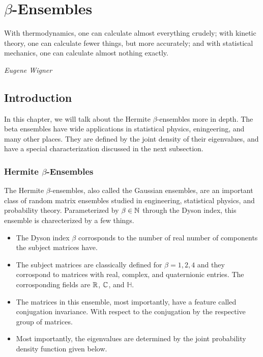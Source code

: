 
\chapter{$\beta$-Ensembles}

\epigraph{With thermodynamics, one can calculate almost everything crudely; with kinetic theory, one can calculate fewer things, but more accurately;
and with statistical mechanics, one can calculate almost nothing exactly.}{\textit{Eugene Wigner}}

\section{Introduction}

In this chapter, we will talk about the Hermite $\beta$-ensembles more in depth.
The beta ensembles have wide applications in statistical physics, eningeering, and many other places.
They are defined by the joint density of their eigenvalues, and have a special characterization discussed in the next subsection.


\subsection{Hermite $\beta$-Ensembles}

The Hermite $\beta$-ensembles, also called the Gaussian ensembles, are an important class of random matrix ensembles studied in engineering, statistical physics, and probability theory.
Parameterized by $\beta \in \mathbb{N}$ through the Dyson index, this ensemble is charecterized by a few things.

\begin{itemize}
  \item The Dyson index $\beta$ corrosponds to the number of real number of components the subject matrices have.
  \item The subject matrices are classically defined for $\beta = 1,2,4$ and they corrospond to matrices with real, complex, and quaternionic entries.
      The corrosponding fields are $\mathbb{R}$, $\mathbb{C}$, and $\mathbb{H}$.
  \item The matrices in this ensemble, most importantly, have a feature called conjugation invariance. With respect to the conjugation by the respective group of matrices.
  \item Most importantly, the eigenvalues are determined by the joint probability density function given below.
\end{itemize}

